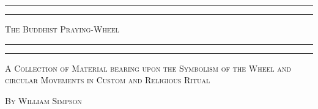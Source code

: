 \documentclass[a4paper, 11pt, oneside, polutonikogreek, english]{article}
\begin{document}
\newcommand{\sau}[1]{%
    \begin{tikzpicture}[#1]
        \draw (-1,1)  -- (0,1)  -- (0,-1) -- (1,-1);
        \draw (-1,-1) -- (-1,0) -- (1,0)  -- (1,1);
    \end{tikzpicture}%
}

\newcommand{\swa}[1]{%
    \begin{tikzpicture}[#1]
        \draw (-1,1)  -- (-1,0) -- (1,0) -- (1,-1);
        \draw (-1,-1) -- (0,-1) -- (0,1) -- (1,1);
    \end{tikzpicture}%
}

\begin{titlepage} %
	\centering %

	
	\rule{\textwidth}{1.6pt}\vspace*{-\baselineskip}\vspace*{2pt} %
	\rule{\textwidth}{0.4pt} %
	
	\vspace{1\baselineskip} %
	
	{\scshape\Huge The Buddhist Praying-Wheel}
	
	\vspace{1\baselineskip} %

	\rule{\textwidth}{0.4pt}\vspace*{-\baselineskip}\vspace{3.2pt} %
	\rule{\textwidth}{1.6pt} %
	
	\vspace{1\baselineskip} %
	
	
	{\scshape \normalsize A Collection of Material bearing upon the Symbolism of the Wheel and circular Movements in Custom and Religious Ritual}

    	\vspace*{1\baselineskip} %

	{\scshape By \Large William Simpson} %
	

\end{titlepage}
\end{document}
